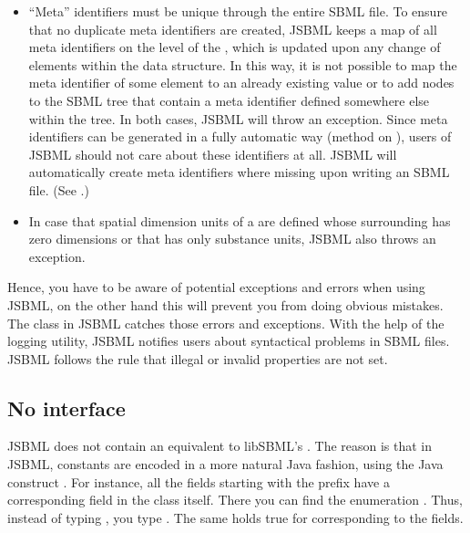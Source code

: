 \begin{itemize}
\item ``Meta'' identifiers must be unique through the entire SBML file. To
  ensure that no duplicate meta identifiers are created, JSBML keeps a map
  of all meta identifiers on the level of the \SBMLDocument, which is
  updated upon any change of elements within the data structure. In this
  way, it is not possible to map the meta identifier of some element to an
  already existing value or to add nodes to the SBML tree that contain a
  meta identifier defined somewhere else within the tree. In both cases,
  JSBML will throw an exception. Since meta identifiers can be generated in
  a fully automatic way (method  on
  ), users of JSBML should not care about these
  identifiers at all. JSBML will automatically create meta identifiers
  where missing upon writing an SBML file.  (See .)

\item In case that spatial dimension units of a \Species{} are defined
  whose surrounding \Compartment{} has zero dimensions or that has only
  substance units, JSBML also throws an exception.

\end{itemize}

Hence, you have to be aware of potential exceptions and errors when using
JSBML,  on the other hand this will prevent you from doing
obvious mistakes. The class \SBMLReader in JSBML catches those errors and
exceptions. With the help of the logging utility, JSBML notifies users
about syntactical problems in SBML files. JSBML follows the rule that
illegal or invalid properties are not set.


\subsection{No interface  }

JSBML does not contain an equivalent to libSBML's
. The reason is that in JSBML, constants are encoded
in a more natural Java fashion, %
using the Java construct . For instance, all the fields starting
with the prefix \ASTTypePrefix{} have a corresponding field in the \ASTNode
class itself.   There you can find the enumeration \ASTType.  Thus, instead of typing
, you type
.  The same holds true for 
corresponding to the 
%
fields.

